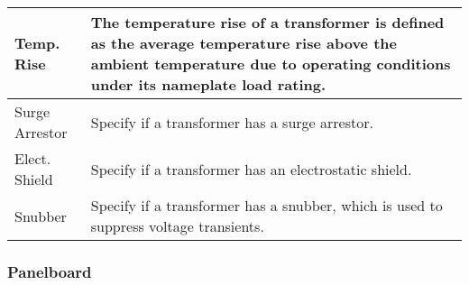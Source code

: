 \documentclass[letterpaper,10pt,english]{sphinxmanual}
\begin{document}
\begin{savenotes}
\begin{tabulary}{\linewidth}[t]{|T|T|}
\\
\hline
Temp. Rise
&
The temperature rise of a transformer is defined as the average temperature rise above the ambient temperature due to operating conditions under its nameplate load rating.
\\
\hline
Surge Arrestor
&
Specify if a transformer has a surge arrestor.
\\
\hline
Elect. Shield
&
Specify if a transformer has an electrostatic shield.
\\
\hline
Snubber
&
Specify if a transformer has a snubber, which is used to suppress voltage transients.
\\
\hline
\end{tabulary}
\par
\sphinxattableend\end{savenotes}


\subsubsection{Panelboard}
\label{\detokenize{docs/definitions/index-definitions:panelboard}}
\end{document}
